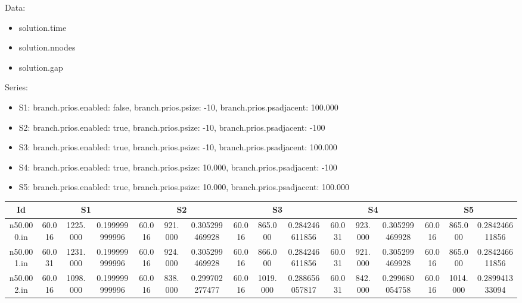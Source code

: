 \documentclass[landscape, 12pt]{report}
\begin{document}
\tiny


Data:
\begin{itemize}
\item solution.time
\item solution.nnodes
\item solution.gap
\end{itemize}
Series:
\begin{itemize}
\item S1: branch.prios.enabled: false, branch.prios.psize: -10, branch.prios.psadjacent: 100.000
\item S2: branch.prios.enabled: true, branch.prios.psize: -10, branch.prios.psadjacent: -100
\item S3: branch.prios.enabled: true, branch.prios.psize: -10, branch.prios.psadjacent: 100.000
\item S4: branch.prios.enabled: true, branch.prios.psize: 10.000, branch.prios.psadjacent: -100
\item S5: branch.prios.enabled: true, branch.prios.psize: 10.000, branch.prios.psadjacent: 100.000
\end{itemize}
\begin{tabular}{|c|ccc|ccc|ccc|ccc|ccc|}
\hline
\multicolumn{1}{|c|}{Id} & \multicolumn{3}{|c|}{S1} & \multicolumn{3}{|c|}{S2} & \multicolumn{3}{|c|}{S3} & \multicolumn{3}{|c|}{S4} & \multicolumn{3}{|c|}{S5}
\\
\hline
n50.000.in & 60.016 & 1225.000 & 0.199999999996 & 60.016 & 921.000 & 0.305299469928 & 60.016 & 865.000 & 0.284246611856 & 60.031 & 923.000 & 0.305299469928 & 60.016 & 865.000 & 0.284246611856
\\
n50.001.in & 60.031 & 1231.000 & 0.199999999996 & 60.016 & 924.000 & 0.305299469928 & 60.016 & 866.000 & 0.284246611856 & 60.031 & 921.000 & 0.305299469928 & 60.016 & 865.000 & 0.284246611856
\\
n50.002.in & 60.016 & 1098.000 & 0.199999999996 & 60.016 & 838.000 & 0.299702277477 & 60.016 & 1019.000 & 0.288656057817 & 60.031 & 842.000 & 0.299680054758 & 60.016 & 1014.000 & 0.289941333094
\\
\hline 
 \end{tabular}

\clearpage
\end{document}
